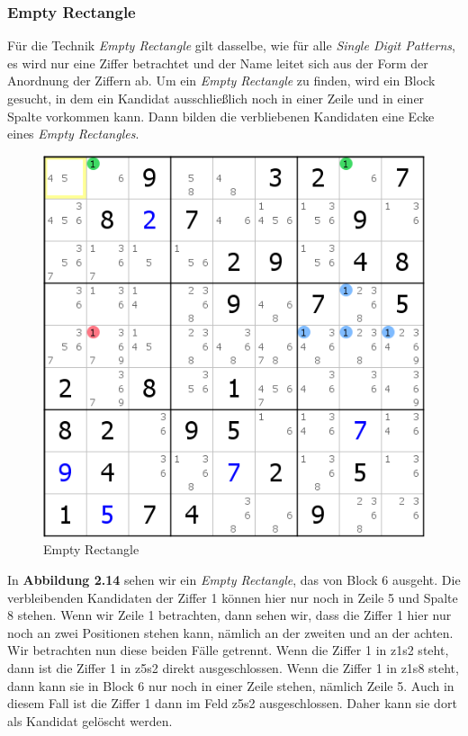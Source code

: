 \newpage
\subsubsection{Empty Rectangle}
Für die Technik \textit{Empty Rectangle} gilt dasselbe, wie für alle \textit{Single Digit Patterns}, es wird nur eine Ziffer betrachtet und der Name leitet sich aus der Form der Anordnung der Ziffern ab. Um ein \textit{Empty Rectangle} zu finden, wird ein Block gesucht, in dem ein Kandidat ausschließlich noch in einer Zeile und in einer Spalte vorkommen kann. Dann bilden die verbliebenen Kandidaten eine Ecke eines \textit{Empty Rectangles}.

\begin{figure}[h]
\begin{center}
\includegraphics{./img/empty_rectangle.png}
\caption{Empty Rectangle}
\end{center}
\end{figure}

\noindent In \textbf{Abbildung 2.14} sehen wir ein \textit{Empty Rectangle}, das von Block 6 ausgeht. Die verbleibenden Kandidaten der Ziffer 1 können hier nur noch in Zeile 5 und Spalte 8 stehen. Wenn wir Zeile 1 betrachten, dann sehen wir, dass die Ziffer 1 hier nur noch an zwei Positionen stehen kann, nämlich an der zweiten und an der achten. Wir betrachten nun diese beiden Fälle getrennt. Wenn die Ziffer 1 in z1s2 steht, dann ist die Ziffer 1 in z5s2 direkt ausgeschlossen. Wenn die Ziffer 1 in z1s8 steht, dann kann sie in Block 6 nur noch in einer Zeile stehen, nämlich Zeile 5. Auch in diesem Fall ist die Ziffer 1 dann im Feld z5s2 ausgeschlossen. Daher kann sie dort als Kandidat gelöscht werden.
